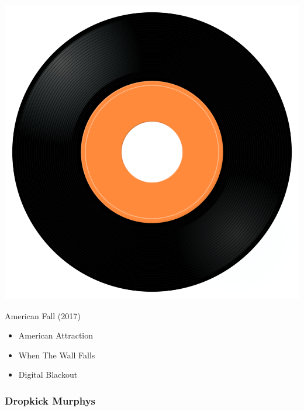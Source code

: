 \begin{minipage}[t]{0.25\textwidth}\vspace{0pt}
\captionsetup{type=figure}
\includegraphics[width=\textwidth]{Images/cover.png}
\caption*{American Fall (2017)}
\end{minipage}
\begin{minipage}[t]{0.25\textwidth}\vspace{0pt}
\begin{itemize}[nosep,leftmargin=1em,labelwidth=*,align=left]
	\setlength{\itemsep}{0pt}
	\item American Attraction
	\item When The Wall Falls
	\item Digital Blackout
\end{itemize}
\end{minipage}

\subsubsection{Dropkick Murphys}

